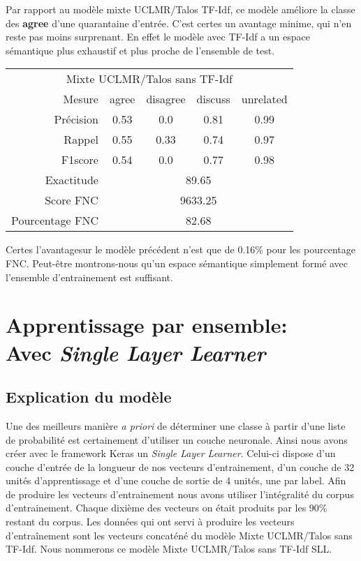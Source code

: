 \documentclass[onecolumn, 12pt]{article}
\begin{document}
Par rapport au modèle mixte UCLMR/Talos TF-Idf, ce modèle améliore la classe des \textbf{agree} d'une quarantaine d'entrée.
C'est certes un avantage minime, qui n'en reste pas moins surprenant.
En effet le modèle avec TF-Idf a un espace sémantique plus exhaustif et plus proche de l'ensemble de test.



\begin{center}
 \begin{tabular}{ r | c c c c }
  \multicolumn{5}{c}{Mixte UCLMR/Talos sans TF-Idf}                              \\
  Mesure          & agree                       & disagree & discuss & unrelated \\
  \hline
  Précision       & 0.53                        & 0.0      & 0.81    & 0.99      \\
  Rappel          & 0.55                        & 0.33     & 0.74    & 0.97      \\
  F1score         & 0.54                        & 0.0      & 0.77    & 0.98      \\
  \hline
  \hline
  Exactitude      & \multicolumn{4}{c}{89.65}                                    \\
  Score FNC       & \multicolumn{4}{c}{9633.25}                                  \\
  Pourcentage FNC & \multicolumn{4}{c}{82.68}                                    \\
 \end{tabular}
\end{center}

Certes l'avantagesur le modèle précédent n'est que de 0.16\% pour les pourcentage FNC.
Peut-être montrons-nous qu'un espace sémantique simplement formé avec l'ensemble d'entrainement est suffisant.



\section{Apprentissage par ensemble: \\ Avec \textit{Single Layer Learner}}
\subsection{Explication du modèle}
Une des meilleurs manière \textit{a priori} de déterminer une classe à partir d'une liste de probabilité est certainement d'utiliser un couche neuronale.
Ainsi nous avons créer avec le framework Keras un \textit{Single Layer Learner}.
Celui-ci dispose d'un couche d'entrée de la longueur de nos vecteurs d'entrainement, d'un couche de 32 unités d'apprentissage et d'une couche de sortie de 4 unités, une par label.
Afin de produire les vecteurs d'entrainement nous avons utiliser l'intégralité du corpus d'entrainement.
Chaque dixième des vecteurs on était produits par les 90\% restant du corpus.
Les données qui ont servi à produire les vecteurs d'entraînement sont les vecteurs concaténé du modèle Mixte UCLMR/Talos sans TF-Idf.
Nous nommerons ce modèle Mixte UCLMR/Talos sans TF-Idf SLL.
\end{document}
